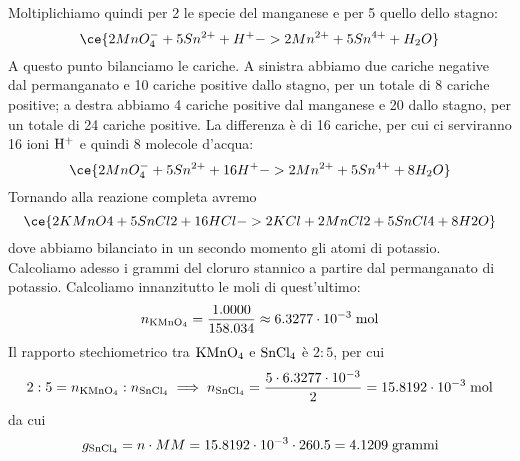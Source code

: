 \begin{soluzione}
    Moltiplichiamo quindi per 2 le specie del manganese e per 5 quello dello stagno:
    \begin{equation*}
        \ce{2MnO_4^- + 5Sn^{2+} + H^+ -> 2Mn^{2+} + 5Sn^{4+} + H_2O}
    \end{equation*}
    A questo punto bilanciamo le cariche. A sinistra abbiamo due cariche negative dal permanganato e 10 cariche positive dallo stagno, per un totale di 8 cariche positive; a destra abbiamo 4 cariche positive dal manganese e 20 dallo stagno, per un totale di 24 cariche positive. La differenza è di 16 cariche, per cui ci serviranno 16 ioni $\rm H^+$ e quindi 8 molecole d'acqua:
    \begin{equation*}
        \ce{2MnO_4^- + 5Sn^{2+} + 16H^+ -> 2Mn^{2+} + 5Sn^{4+} + 8H_2O}
    \end{equation*}
    Tornando alla reazione completa avremo
    \begin{equation*}
        \ce{2KMnO4 + 5SnCl2 + 16HCl -> 2KCl + 2MnCl2 + 5SnCl4 + 8H2O}
    \end{equation*}
    dove abbiamo bilanciato in un secondo momento gli atomi di potassio.\\
    Calcoliamo adesso i grammi del cloruro stannico a partire dal permanganato di potassio. Calcoliamo innanzitutto le moli di quest'ultimo:
    \begin{equation*}
        n_{\rm KMnO_4}=\frac{1.0000}{158.034}
        \approx 6.3277 \cdot 10^{-3} \; \rm mol
    \end{equation*}
    Il rapporto stechiometrico tra $\rm KMnO_4$ e $\rm SnCl_4$ è $2:5$, per cui 
    \begin{equation*}
        2:5=n_{\rm KMnO_4}:n_{\rm SnCl_4}
        \implies
        n_{\rm SnCl_4}=\frac{5 \cdot 6.3277 \cdot 10^{-3}}{2}
        =15.8192 \cdot 10^{-3} \; \rm mol
    \end{equation*}
    da cui
    \begin{equation*}
        g_{\rm SnCl_4}
        =n \cdot MM=15.8192 \cdot 10^{-3} \cdot 260.5
        =4.1209 \; \rm grammi
    \end{equation*}
\end{soluzione}

\newpage

